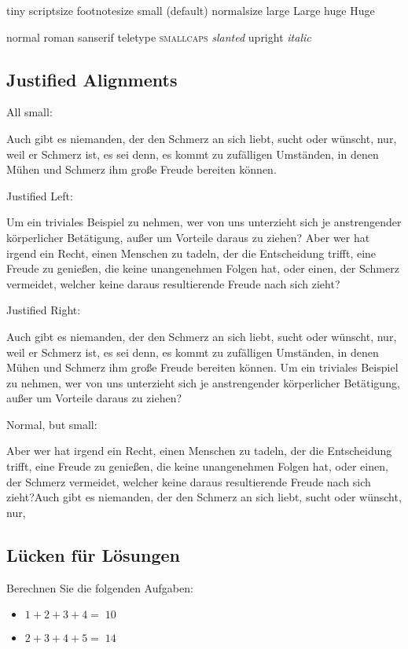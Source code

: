 \documentclass[]{article}
\providecommand{\tightlist}{%
  \setlength{\itemsep}{0pt}\setlength{\parskip}{0pt}}
\begin{document}
{{\tiny{}tiny}} {{\scriptsize{}scriptsize}}
{{\footnotesize{}footnotesize}} {{\small{}small}} (default)
{{\normalsize{}normalsize}} {{\Large{}large}} {{\Large{}Large}}
{{\huge{}huge}} {{\Huge{}Huge}}

{{\normalfont{}normal}} {{\rmfamily{}roman}} {{\sffamily{}sanserif}}
{{\ttfamily{}teletype}} \textsc{smallcaps} {{\slshape{}slanted}}
{{\upshape{}upright}} {{\itshape{}italic}}

\hypertarget{justified-alignments}{%
\subsection{Justified Alignments}\label{justified-alignments}}

All small:

{\small{}

Auch gibt es niemanden, der den Schmerz an sich liebt, sucht oder
wünscht, nur, weil er Schmerz ist, es sei denn, es kommt zu zufälligen
Umständen, in denen Mühen und Schmerz ihm große Freude bereiten können.

Justified Left:


\begin{flushright}

Um ein triviales Beispiel zu nehmen, wer von uns unterzieht sich je
anstrengender körperlicher Betätigung, außer um Vorteile daraus zu
ziehen? Aber wer hat irgend ein Recht, einen Menschen zu tadeln, der die
Entscheidung trifft, eine Freude zu genießen, die keine unangenehmen
Folgen hat, oder einen, der Schmerz vermeidet, welcher keine daraus
resultierende Freude nach sich zieht?


\end{flushright}

Justified Right:


\begin{flushleft}

Auch gibt es niemanden, der den Schmerz an sich liebt, sucht oder
wünscht, nur, weil er Schmerz ist, es sei denn, es kommt zu zufälligen
Umständen, in denen Mühen und Schmerz ihm große Freude bereiten können.
Um ein triviales Beispiel zu nehmen, wer von uns unterzieht sich je
anstrengender körperlicher Betätigung, außer um Vorteile daraus zu
ziehen?


\end{flushleft}

Normal, but small:

Aber wer hat irgend ein Recht, einen Menschen zu tadeln, der die
Entscheidung trifft, eine Freude zu genießen, die keine unangenehmen
Folgen hat, oder einen, der Schmerz vermeidet, welcher keine daraus
resultierende Freude nach sich zieht?Auch gibt es niemanden, der den
Schmerz an sich liebt, sucht oder wünscht, nur,

}

\hypertarget{lucken-fur-losungen}{%
\subsection{Lücken für Lösungen}\label{lucken-fur-losungen}}

Berechnen Sie die folgenden Aufgaben:

\begin{itemize}
\tightlist
\item
  \(1+2+3+4=\;\){\(10\)}
\item
  \(2+3+4+5=\;\){\(14\)}
\end{itemize}
\end{document}
